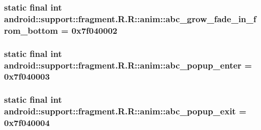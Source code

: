 \hypertarget{classandroid_1_1support_1_1fragment_1_1_r_1_1anim_63e44f420497645dc1a5554984273c92}{
\subsubsection[{abc\_\-grow\_\-fade\_\-in\_\-from\_\-bottom}]{\setlength{\rightskip}{0pt plus 5cm}static final int android::support::fragment.R.R::anim::abc\_\-grow\_\-fade\_\-in\_\-from\_\-bottom = 0x7f040002}}
\label{classandroid_1_1support_1_1fragment_1_1_r_1_1anim_63e44f420497645dc1a5554984273c92}


\hypertarget{classandroid_1_1support_1_1fragment_1_1_r_1_1anim_5a04bf36f644f39803b5536e14774397}{
\subsubsection[{abc\_\-popup\_\-enter}]{\setlength{\rightskip}{0pt plus 5cm}static final int android::support::fragment.R.R::anim::abc\_\-popup\_\-enter = 0x7f040003}}
\label{classandroid_1_1support_1_1fragment_1_1_r_1_1anim_5a04bf36f644f39803b5536e14774397}


\hypertarget{classandroid_1_1support_1_1fragment_1_1_r_1_1anim_c2884bc66cf87894b1c05ee9229fe62e}{
\subsubsection[{abc\_\-popup\_\-exit}]{\setlength{\rightskip}{0pt plus 5cm}static final int android::support::fragment.R.R::anim::abc\_\-popup\_\-exit = 0x7f040004}}
\label{classandroid_1_1support_1_1fragment_1_1_r_1_1anim_c2884bc66cf87894b1c05ee9229fe62e}


